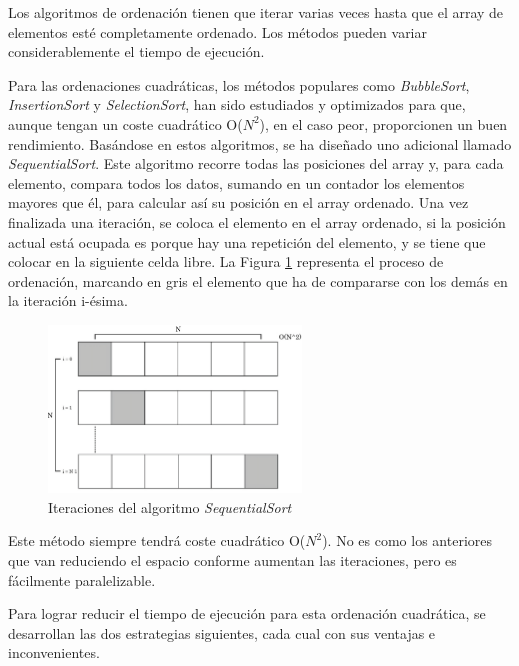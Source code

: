 		
	
	Los algoritmos de ordenación tienen que iterar varias veces hasta que el array de elementos esté completamente ordenado. Los métodos pueden variar considerablemente el tiempo de ejecución.
	

	
	Para las ordenaciones cuadráticas, los métodos populares como \textit{BubbleSort}, \textit{InsertionSort} y \textit{SelectionSort}, han sido estudiados y optimizados para que, aunque tengan un coste cuadrático O(\(N^{2}\)), en el caso peor, proporcionen un buen rendimiento. Basándose en estos algoritmos, se ha diseñado uno adicional llamado \textit{SequentialSort}. Este algoritmo recorre todas las posiciones del array y, para cada elemento, compara todos los datos, sumando en un contador los elementos mayores que él, para calcular así su posición en el array ordenado. Una vez finalizada una iteración, se coloca el elemento en el array ordenado, si la posición actual está ocupada es porque hay una repetición del elemento, y se tiene que colocar en la siguiente celda libre. La Figura \ref{fig:sequentialsortmpi} representa el proceso de ordenación, marcando en gris el elemento que ha de compararse con los demás en la iteración i-ésima.
	
	\begin{figure}[!h]
		\centering
		\includegraphics[width=0.6\textwidth]{images/chapter_3/sequentialsort_mpi}
		\caption{Iteraciones del algoritmo \textit{SequentialSort}}
		\label{fig:sequentialsortmpi}
	\end{figure}
	
	Este método siempre tendrá coste cuadrático O(\(N^{2}\)). No es como los anteriores que van reduciendo el espacio conforme aumentan las iteraciones, pero es fácilmente paralelizable. 
	
	Para lograr reducir el tiempo de ejecución para esta ordenación cuadrática, se desarrollan las dos estrategias siguientes, cada cual con sus ventajas e inconvenientes.
	
